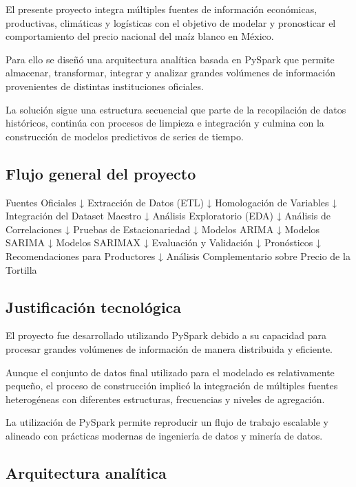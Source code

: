 \documentclass[11pt]{article}
\begin{document}
El presente proyecto integra múltiples fuentes de información
económicas, productivas, climáticas y logísticas con el objetivo de
modelar y pronosticar el comportamiento del precio nacional del maíz
blanco en México.

Para ello se diseñó una arquitectura analítica basada en PySpark que
permite almacenar, transformar, integrar y analizar grandes volúmenes de
información provenientes de distintas instituciones oficiales.

La solución sigue una estructura secuencial que parte de la recopilación
de datos históricos, continúa con procesos de limpieza e integración y
culmina con la construcción de modelos predictivos de series de tiempo.

\hypertarget{flujo-general-del-proyecto}{%
\subsection{Flujo general del
proyecto}\label{flujo-general-del-proyecto}}

Fuentes Oficiales ↓ Extracción de Datos (ETL) ↓ Homologación de
Variables ↓ Integración del Dataset Maestro ↓ Análisis Exploratorio
(EDA) ↓ Análisis de Correlaciones ↓ Pruebas de Estacionariedad ↓ Modelos
ARIMA ↓ Modelos SARIMA ↓ Modelos SARIMAX ↓ Evaluación y Validación ↓
Pronósticos ↓ Recomendaciones para Productores ↓ Análisis Complementario
sobre Precio de la Tortilla

\hypertarget{justificaciuxf3n-tecnoluxf3gica}{%
\subsection{Justificación
tecnológica}\label{justificaciuxf3n-tecnoluxf3gica}}

El proyecto fue desarrollado utilizando PySpark debido a su capacidad
para procesar grandes volúmenes de información de manera distribuida y
eficiente.

Aunque el conjunto de datos final utilizado para el modelado es
relativamente pequeño, el proceso de construcción implicó la integración
de múltiples fuentes heterogéneas con diferentes estructuras,
frecuencias y niveles de agregación.

La utilización de PySpark permite reproducir un flujo de trabajo
escalable y alineado con prácticas modernas de ingeniería de datos y
minería de datos.

\hypertarget{arquitectura-analuxedtica}{%
\subsection{Arquitectura analítica}\label{arquitectura-analuxedtica}}
\end{document}
